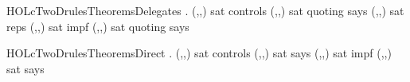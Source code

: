 \newcommand{\HOLcTwoDrulesTheoremsAlternateControlsRepsTwo}{\UseVerbatim{HOLcTwoDrulesTheoremsAlternateControlsRepsTwo}}
\begin{SaveVerbatim}{HOLcTwoDrulesTheoremsDelegates}
\HOLTokenTurnstile{} \HOLTokenForall{}        .
     (,,) sat  controls  \HOLTokenImp{}
     (,,) sat  quoting  says  \HOLTokenImp{}
     (,,) sat reps    \HOLTokenImp{}
     (,,) sat  impf  \HOLTokenImp{}
     (,,) sat  quoting  says 
\end{SaveVerbatim}
\newcommand{\HOLcTwoDrulesTheoremsDelegates}{\UseVerbatim{HOLcTwoDrulesTheoremsDelegates}}
\begin{SaveVerbatim}{HOLcTwoDrulesTheoremsDirect}
\HOLTokenTurnstile{} \HOLTokenForall{}      .
     (,,) sat  controls  \HOLTokenImp{}
     (,,) sat  says  \HOLTokenImp{}
     (,,) sat  impf  \HOLTokenImp{}
     (,,) sat  says 
\end{SaveVerbatim}
\newcommand{\HOLcTwoDrulesTheoremsDirect}{\UseVerbatim{HOLcTwoDrulesTheoremsDirect}}
